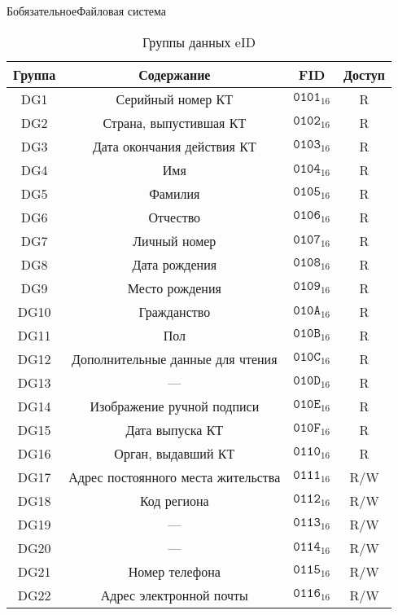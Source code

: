 \begin{appendix}{Б}{обязательное}{Файловая система}
\begin{table}[H]
\caption{Группы данных eID}
\label{Table.FILES.DG}
\begin{tabular}{|c|c|c|c|}
\hline
Группа & Содержание & FID & Доступ\\
\hline
\hline
DG1 & Серийный номер КТ & 
$\texttt{0101}_{16}$ & R\\
DG2 & Страна, выпустившая КТ & 
$\texttt{0102}_{16}$ & R\\
DG3 & Дата окончания действия КТ & 
$\texttt{0103}_{16}$ & R\\
DG4 & Имя & 
$\texttt{0104}_{16}$ & R\\
DG5 & Фамилия & 
$\texttt{0105}_{16}$ & R\\
DG6 & Отчество & 
$\texttt{0106}_{16}$ & R\\
DG7 & Личный номер & 
$\texttt{0107}_{16}$ & R\\
DG8 & Дата рождения & 
$\texttt{0108}_{16}$ & R\\
DG9 & Место рождения & 
$\texttt{0109}_{16}$ & R\\
DG10 & Гражданство & 
$\texttt{010A}_{16}$ & R\\
DG11 & Пол & 
$\texttt{010B}_{16}$ & R\\
DG12 & Дополнительные данные для чтения & 
$\texttt{010C}_{16}$ & R\\
DG13 & 
--- &
$\texttt{010D}_{16}$ & R\\
DG14 & Изображение ручной подписи & 
$\texttt{010E}_{16}$ & R\\
DG15 & Дата выпуска КТ & 
$\texttt{010F}_{16}$ & R\\
DG16 & Орган, выдавший КТ &  
$\texttt{0110}_{16}$ & R\\
DG17 & 	Адрес постоянного места жительства & 
$\texttt{0111}_{16}$ & R/W\\
DG18 & 	Код региона & 
$\texttt{0112}_{16}$ & R/W\\
DG19 & 	
--- &
$\texttt{0113}_{16}$ & R/W\\
DG20 & 	
--- &
$\texttt{0114}_{16}$ & R/W\\
DG21 & 	Номер телефона & 
$\texttt{0115}_{16}$ & R/W\\
DG22 & 	Адрес электронной почты & 
$\texttt{0116}_{16}$ & R/W\\
\hline
\end{tabular}
\end{table}



\end{appendix}

